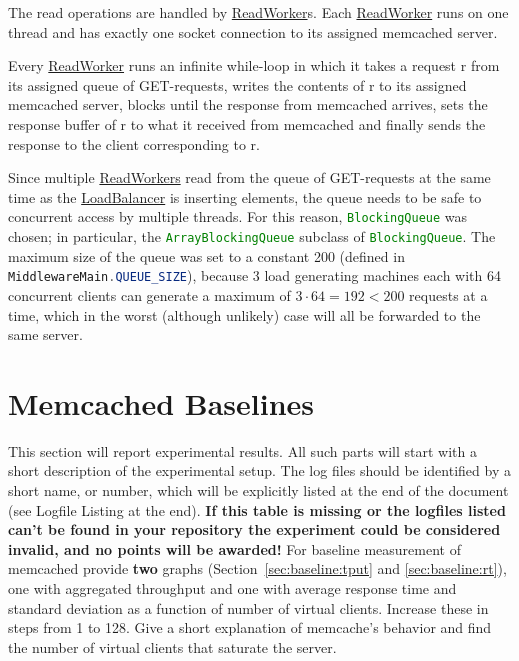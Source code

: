 \documentclass[11pt]{article}
\newcommand{\code}[1]{\lstinline[language=Java]{#1}}
\newcommand{\todo}[1]{\fcolorbox{black}{Apricot}{TODO: #1}}
\newcommand{\linkmain}[1]{\href{https://gitlab.inf.ethz.ch/pungast/asl-fall16-project/blob/master/src/main/java/asl/#1.java}{#1}}
\begin{document}
The read operations are handled by \href{https://gitlab.inf.ethz.ch/pungast/asl-fall16-project/blob/master/src/main/java/asl/ReadWorker.java}{ReadWorker}s. Each \linkmain{ReadWorker} runs on one thread and has exactly one socket connection to its assigned memcached server.

Every \linkmain{ReadWorker} runs an infinite while-loop in which it takes a request r from its assigned queue of GET-requests, writes the contents of r to its assigned memcached server, blocks until the response from memcached arrives, sets the response buffer of r to what it received from memcached and finally sends the response to the client corresponding to r.

Since multiple \linkmain{ReadWorkers} read from the queue of GET-requests at the same time as the \linkmain{LoadBalancer} is inserting elements, the queue needs to be safe to concurrent access by multiple threads. For this reason, \code{BlockingQueue} was chosen; in particular, the \code{ArrayBlockingQueue} subclass of \code{BlockingQueue}. The maximum size of the queue was set to a constant 200 (defined in \code{MiddlewareMain.QUEUE_SIZE}), because 3 load generating machines each with 64 concurrent clients can generate a maximum of $3 \cdot 64 = 192 < 200$ requests at a time, which in the worst (although unlikely) case will all be forwarded to the same server.


\section{Memcached Baselines}\label{sec:baseline}

\todo{}

This section will report experimental results. All such parts will start with a short description of the experimental setup. The log files should be identified by a short name, or number, which will be explicitly listed at the end of the document (see Logfile Listing at the end).  \textbf{If this table is missing or the logfiles listed can't be found in your repository the experiment could be considered invalid, and no points will be awarded!}
For baseline measurement of memcached provide \textbf{two} graphs (Section~\ref{sec:baseline:tput} and \ref{sec:baseline:rt}), one with aggregated throughput and one with average response time and standard deviation as a function of number of virtual clients. Increase these in steps from 1 to 128. Give a short explanation of memcache's behavior and find the number of virtual clients that saturate the server.
\end{document}
